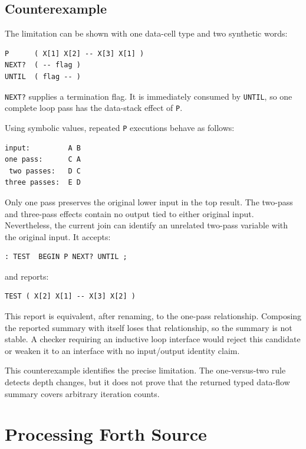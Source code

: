 \documentclass[11pt,a4paper]{article}
\begin{document}
\subsection{Counterexample}

The limitation can be shown with one data-cell type and two synthetic words:

\begin{lstlisting}
P      ( X[1] X[2] -- X[3] X[1] )
NEXT?  ( -- flag )
UNTIL  ( flag -- )
\end{lstlisting}

\texttt{NEXT?} supplies a termination flag.  It is immediately consumed by
\texttt{UNTIL}, so one complete loop pass has the data-stack effect of
\texttt{P}.

Using symbolic values, repeated \texttt{P} executions behave as follows:

\begin{lstlisting}
input:         A B
one pass:      C A
 two passes:   D C
three passes:  E D
\end{lstlisting}

Only one pass preserves the original lower input in the top result.  The
two-pass and three-pass effects contain no output tied to either original
input.  Nevertheless, the current join can identify an unrelated two-pass
variable with the original input.  It accepts:

\begin{lstlisting}
: TEST  BEGIN P NEXT? UNTIL ;
\end{lstlisting}

and reports:

\begin{lstlisting}
TEST ( X[2] X[1] -- X[3] X[2] )
\end{lstlisting}

This report is equivalent, after renaming, to the one-pass relationship.
Composing the reported summary with itself loses that relationship, so the
summary is not stable.  A checker requiring an inductive loop interface would
reject this candidate or weaken it to an interface with no input/output
identity claim.

This counterexample identifies the precise limitation.  The one-versus-two rule
detects depth changes, but it does not prove that the returned typed data-flow
summary covers arbitrary iteration counts.

\section{Processing Forth Source}
\label{sec:source}
\end{document}

